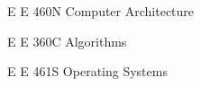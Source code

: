 



\begin{cvhonors}

  \cvhonor
    {E E 460N} %
    {Computer Architecture} %
    {} %
    {} %

  \cvhonor
    {E E 360C} %
    {Algorithms} %
    {} %
    {} %

\end{cvhonors}




\begin{cvhonors}

  \cvhonor
    {E E 461S} %
    {Operating Systems} %
    {} %
    {} %

\end{cvhonors}
